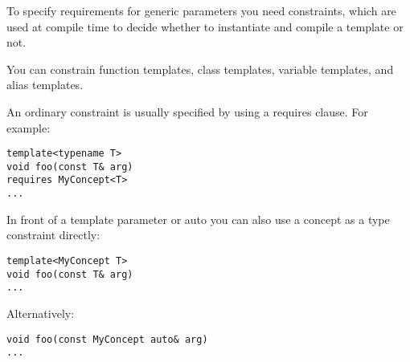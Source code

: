 To specify requirements for generic parameters you need constraints, which are used at compile time to decide whether to instantiate and compile a template or not.

You can constrain function templates, class templates, variable templates, and alias templates.

An ordinary constraint is usually specified by using a requires clause. For example:

\begin{lstlisting}[style=styleCXX]
template<typename T>
void foo(const T& arg)
requires MyConcept<T>
...
\end{lstlisting}

In front of a template parameter or auto you can also use a concept as a type constraint directly:

\begin{lstlisting}[style=styleCXX]
template<MyConcept T>
void foo(const T& arg)
...
\end{lstlisting}

Alternatively:

\begin{lstlisting}[style=styleCXX]
void foo(const MyConcept auto& arg)
...
\end{lstlisting}












